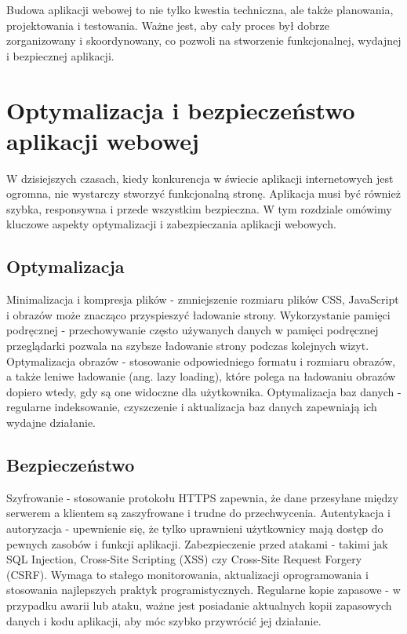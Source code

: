 Budowa aplikacji webowej to nie tylko kwestia techniczna, ale także planowania, projektowania i testowania. Ważne jest, aby cały proces był dobrze zorganizowany i skoordynowany, co pozwoli na stworzenie funkcjonalnej, wydajnej i bezpiecznej aplikacji.

\section{Optymalizacja i bezpieczeństwo aplikacji webowej}

W dzisiejszych czasach, kiedy konkurencja w świecie aplikacji internetowych jest ogromna, nie wystarczy stworzyć funkcjonalną stronę. Aplikacja musi być również szybka, responsywna i przede wszystkim bezpieczna. W tym rozdziale omówimy kluczowe aspekty optymalizacji i zabezpieczania aplikacji webowych.

\subsection{Optymalizacja}

Minimalizacja i kompresja plików - zmniejszenie rozmiaru plików CSS, JavaScript i obrazów może znacząco przyspieszyć ładowanie strony.
Wykorzystanie pamięci podręcznej - przechowywanie często używanych danych w pamięci podręcznej przeglądarki pozwala na szybsze ładowanie strony podczas kolejnych wizyt.
Optymalizacja obrazów - stosowanie odpowiedniego formatu i rozmiaru obrazów, a także leniwe ładowanie (ang. lazy loading), które polega na ładowaniu obrazów dopiero wtedy, gdy są one widoczne dla użytkownika.
Optymalizacja baz danych - regularne indeksowanie, czyszczenie i aktualizacja baz danych zapewniają ich wydajne działanie.

\subsection{Bezpieczeństwo}

Szyfrowanie - stosowanie protokołu HTTPS zapewnia, że dane przesyłane między serwerem a klientem są zaszyfrowane i trudne do przechwycenia.
Autentykacja i autoryzacja - upewnienie się, że tylko uprawnieni użytkownicy mają dostęp do pewnych zasobów i funkcji aplikacji.
Zabezpieczenie przed atakami - takimi jak SQL Injection, Cross-Site Scripting (XSS) czy Cross-Site Request Forgery (CSRF). Wymaga to stałego monitorowania, aktualizacji oprogramowania i stosowania najlepszych praktyk programistycznych.
Regularne kopie zapasowe - w przypadku awarii lub ataku, ważne jest posiadanie aktualnych kopii zapasowych danych i kodu aplikacji, aby móc szybko przywrócić jej działanie.

